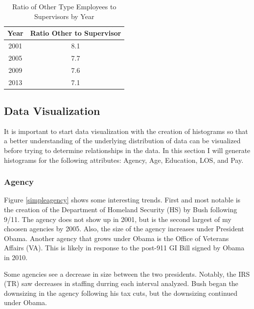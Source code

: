 \documentclass{article}
\begin{document}
            \begin{center}
                \begin{table}
                    \centering
                    \begin{tabular}{ |c|c| }
                        \hline
                        Year & Ratio Other to Supervisor \\
                        \hline
                        2001 & 8.1 \\
                        2005 & 7.7 \\
                        2009 & 7.6 \\
                        2013 & 7.1 \\
                        \hline
                    \end{tabular}
                    \caption{Ratio of Other Type Employees to Supervisors by Year}
                    \label{tab:12}
                \end{table}
            \end{center}


    \subsection{Data Visualization}
    It is important to start data visualization with the creation of histograms so that a better understanding of the underlying distribution of data can be visualized before trying to determine relationships in the data. In this section I will generate histograms for the following attributes: Agency, Age, Education, LOS, and Pay.

        \subsubsection{Agency}
        Figure \ref{simpleagency} shows some interesting trends. First and most notable is the creation of the Department of Homeland Security (HS) by Bush following 9/11. The agency does not show up in 2001, but is the second largest of my choosen agencies by 2005. Also, the size of the agency increases under President Obama. Another agency that grows under Obama is the Office of Veterans Affairs (VA). This is likely in response to the post-911 GI Bill signed by Obama in 2010.
        \par
        Some agencies see a decrease in size between the two presidents. Notably, the IRS (TR) saw decreases in staffing durring each interval analyzed. Bush began the downsizing in the agency following his tax cuts, but the downsizing continued under Obama.
\end{document}
